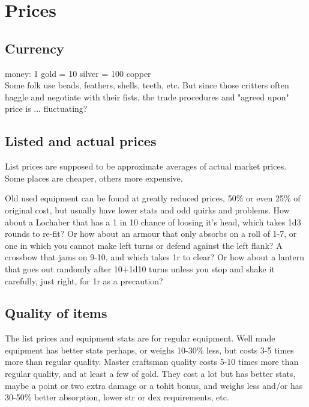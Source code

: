 

\cleardoublepage

\chapter*{Prices}




\section*{Currency}
money: 1 gold = 10 silver = 100 copper\\
Some folk use beads, feathers, shells, teeth, etc. But since those critters often haggle and negotiate with their fists, the trade procedures and "agreed upon" price is ... fluctuating?




\section*{Listed and actual prices}
List prices are supposed to be approximate averages of actual market prices. Some places are cheaper, others more expensive.

Old used equipment can be found at greatly reduced prices, 50\% or even 25\% of original cost, but usually have lower stats and odd quirks and problems. How about a Lochaber that has a 1 in 10 chance of loosing it's head, which takes 1d3 rounds to re-fit? Or how about an armour that only absorbs on a roll of 1-7, or one in which you cannot make left turns or defend against the left flank? A crossbow that jams on 9-10, and which takes 1r to clear? Or how about a lantern that goes out randomly after 10+1d10 turns unless you stop and shake it carefully, just right, for 1r as a precaution?


\section*{Quality of items}
The list prices and equipment stats are for regular equipment. Well made equipment has better stats perhaps, or weighs 10-30\% less, but costs 3-5 times more than regular quality. Master craftsman quality costs 5-10 times more than regular quality, and at least a few of gold. They cost a lot but has better stats, maybe a point or two extra damage or a tohit bonus, and weighs less and/or has 30-50\% better absorption, lower str or dex requirements, etc.

